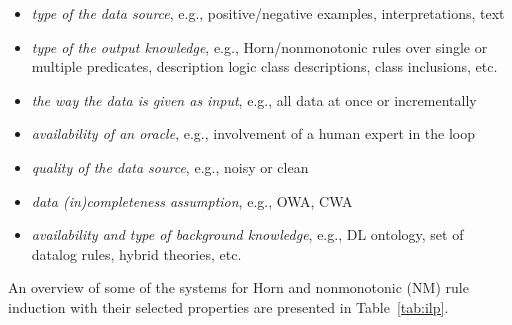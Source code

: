 \begin{itemize}
\item \emph{type of the data source}, e.g., positive/negative examples, interpretations, text
\item \emph{type of the output knowledge}, e.g., Horn/nonmonotonic rules over single or multiple predicates, description logic class descriptions, class inclusions, etc.
\item \emph{the way the data is given as input}, e.g., all data at once or incrementally
\item \emph{availability of an oracle}, e.g., involvement of a human expert in the loop
\item \emph{quality of the data source}, e.g., noisy or clean
\item \emph{data (in)completeness assumption}, e.g., OWA, CWA
\item \emph{availability and type of background knowledge}, e.g., DL ontology, set of datalog rules, hybrid theories, etc.

\end{itemize}

An overview of some of the systems for Horn and nonmonotonic (NM) rule induction with their selected properties are presented in Table~\ref{tab:ilp}. 

